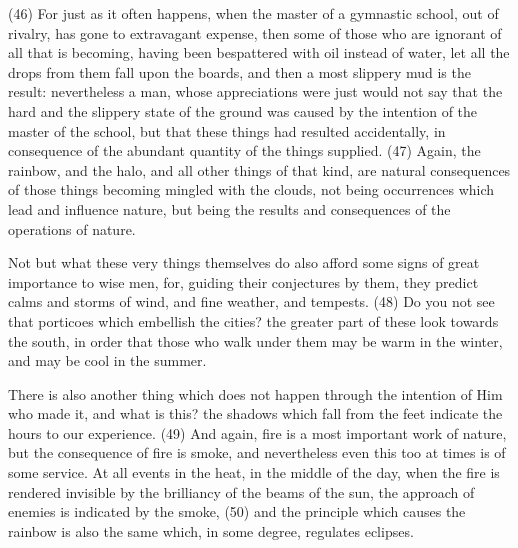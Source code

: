 (46) For just as it often happens, when the master of a gymnastic school, out of rivalry, has gone
to extravagant expense, then some of those who are ignorant of all that is becoming, having been
bespattered with oil instead of water, let all the drops from them fall upon the boards, and then a
most slippery mud is the result: nevertheless a man, whose appreciations were just would not say
that the hard and the slippery state of the ground was caused by the intention of the master of the
school, but that these things had resulted accidentally, in consequence of the abundant quantity of
the things supplied. (47) Again, the rainbow, and the halo, and all other things of that kind, are
natural consequences of those things becoming mingled with the clouds, not being occurrences
which lead and influence nature, but being the results and consequences of the operations of
nature.

Not but what these very things themselves do also afford some signs of great importance to wise
men, for, guiding their conjectures by them, they predict calms and storms of wind, and fine
weather, and tempests. (48) Do you not see that porticoes which embellish the cities? the greater
part of these look towards the south, in order that those who walk under them may be warm in the
winter, and may be cool in the summer.

There is also another thing which does not happen through the intention of Him who made it, and
what is this? the shadows which fall from the feet indicate the hours to our experience. (49) And
again, fire is a most important work of nature, but the consequence of fire is smoke, and
nevertheless even this too at times is of some service. At all events in the heat, in the middle of the
day, when the fire is rendered invisible by the brilliancy of the beams of the sun, the approach of
enemies is indicated by the smoke, (50) and the principle which causes the rainbow is also the
same which, in some degree, regulates eclipses.

